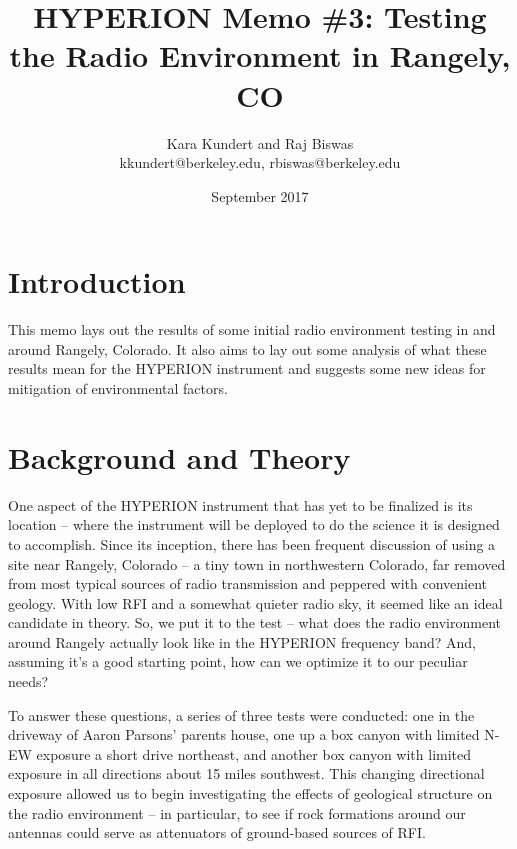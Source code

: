 \documentclass[11pt]{article}
\makeatletter
\newcommand{\thetitle}{HYPERION Memo \#3: Testing the Radio Environment in 
Rangely, CO}
\newcommand{\theauthor}{Kara Kundert and Raj Biswas}
\newcommand{\theauthorsemail}{kkundert@berkeley.edu, rbiswas@berkeley.edu}
\newcommand{\thedate}{September 2017}
\makeatother
\begin{document}
\title{
    \sffamily\bfseries\huge
    \thetitle \\
}
\author{
    \sffamily\theauthor \\
    \sffamily\theauthorsemail
}
\date{\thedate}
\maketitle
\sloppy

\section{Introduction}

This memo lays out the results of some initial radio environment testing in and 
around Rangely, Colorado. It also aims to lay out some analysis of what these 
results mean for the HYPERION instrument and suggests some new ideas for 
mitigation of environmental factors.

\section{Background and Theory}

One aspect of the HYPERION instrument that has yet to be finalized is its 
location -- where the instrument will be deployed to do the science it is 
designed to accomplish. Since its inception, there has been frequent discussion 
of using a site near Rangely, Colorado -- a tiny town in northwestern Colorado, 
far removed from most typical sources of radio transmission and peppered with 
convenient geology. With low RFI and a somewhat quieter radio sky, it seemed 
like an ideal candidate in theory. So, we put it to the test -- what does the 
radio environment around Rangely actually look like in the HYPERION frequency 
band? And, assuming it's a good starting point, how can we optimize it to our 
peculiar needs?

To answer these questions, a series of three tests were conducted: one in the 
driveway of Aaron Parsons' parents house, one up a box canyon with limited N-EW 
exposure a short drive northeast, and another box canyon with limited exposure 
in all directions about 15 miles southwest. This changing directional exposure 
allowed us to begin investigating the effects of geological structure on the 
radio environment -- in particular, to see if rock formations around our 
antennas could serve as attenuators of ground-based sources of RFI. 
\end{document}

